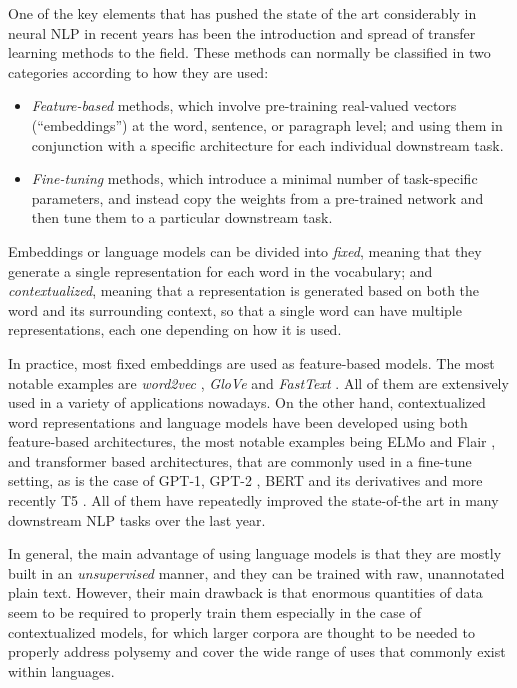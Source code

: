 One of the key elements that has pushed the state of the art considerably in neural NLP in recent years has been the introduction and spread of transfer learning methods to the field. These methods can normally be classified in two categories according to how they are used:
\begin{itemize}
    \item \emph{Feature-based} methods, which involve pre-training real-valued vectors (``embeddings'') at the word, sentence, or paragraph level; and using them in conjunction with a specific architecture for each individual downstream task.
    \item \emph{Fine-tuning} methods, which introduce a minimal number of task-specific parameters, and instead copy the weights from a pre-trained network and then tune them to a particular downstream task.
\end{itemize}
Embeddings or language models can be divided into \emph{fixed}, meaning that they generate a single representation for each word in the vocabulary; and \emph{contextualized}, meaning that a representation is generated based on both the word and its surrounding context, so that a single word can have multiple representations, each one depending on how it is used.

In practice, most fixed embeddings are used as feature-based models. The most notable examples are \emph{word2vec} \citep{mikolov-etal-2013-distributed}, \emph{GloVe} \citep{pennington-etal-2014-glove} and \emph{FastText} \citep{mikolov-etal-2018-advances}. All of them are extensively used in a variety of applications nowadays. On the other hand, contextualized word representations and language models have been developed using both feature-based architectures, the most notable examples being ELMo and Flair \citep{peters-etal-2018-deep,akbik-etal-2018-contextual}, and transformer based architectures, that are commonly used in a fine-tune setting, as is the case of GPT-1, GPT-2 \citep{radford-etal-2018-improving,radford-etal-2019-language}, BERT and its derivatives \citep{devlin-etal-2019-bert,liu-etal-2019-roberta,lan-etal-2020-albert} and more recently T5 \citep{raffel-etal-2020-exploring}. All of them have repeatedly improved the state-of-the art in many downstream NLP tasks over the last year.

In general, the main advantage of using language models is that they are mostly built in an \emph{unsupervised} manner, and they can be trained with raw, unannotated plain text. However, their main drawback is that enormous quantities of data seem to be required to properly train them especially in the case of contextualized models, for which larger corpora are thought to be needed to properly address polysemy and cover the wide range of uses that commonly exist within languages.

